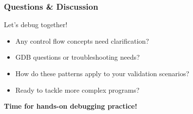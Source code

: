 \documentclass{beamer}
\begin{document}
\begin{frame}
\frametitle{Questions \& Discussion}
\begin{center}
\Large Let's debug together!
\end{center}

\begin{itemize}
    \item Any control flow concepts need clarification?
    \item GDB questions or troubleshooting needs?
    \item How do these patterns apply to your validation scenarios?
    \item Ready to tackle more complex programs?
\end{itemize}

\vspace{1cm}
\begin{center}
\textbf{Time for hands-on debugging practice!}
\end{center}
\end{frame}
\end{document}
